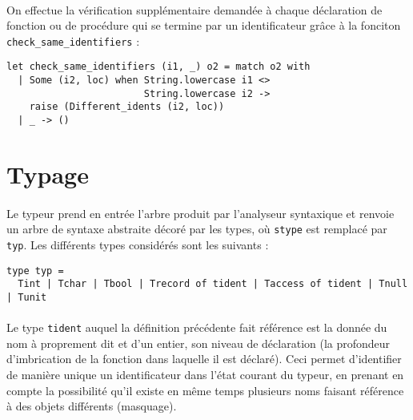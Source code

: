 \documentclass[a4paper,12pt]{article}
\begin{document}
\paragraph*{}
On effectue la vérification supplémentaire demandée à chaque déclaration de fonction ou de procédure qui se termine par un identificateur grâce à la fonciton \texttt{check\_same\_identifiers} :

\begin{lstlisting}
let check_same_identifiers (i1, _) o2 = match o2 with
  | Some (i2, loc) when String.lowercase i1 <> 
                        String.lowercase i2 ->
    raise (Different_idents (i2, loc))
  | _ -> ()
\end{lstlisting}

\section{Typage}

\paragraph*{}
Le typeur prend en entrée l'arbre produit par l'analyseur syntaxique et renvoie un arbre de syntaxe abstraite décoré par les types, où \texttt{stype} est remplacé par \texttt{typ}. Les différents types considérés sont les suivants :

\begin{lstlisting}
type typ =
  Tint | Tchar | Tbool | Trecord of tident | Taccess of tident | Tnull | Tunit 
\end{lstlisting}

\paragraph*{}
Le type \texttt{tident} auquel la définition précédente fait référence est la donnée du nom à proprement dit et d'un entier, son niveau de déclaration (la profondeur d'imbrication de la fonction dans laquelle il est déclaré). Ceci permet d'identifier de manière unique un identificateur dans l'état courant du typeur, en prenant en compte la possibilité qu'il existe en même temps plusieurs noms faisant référence à des objets différents (masquage).
\end{document}
